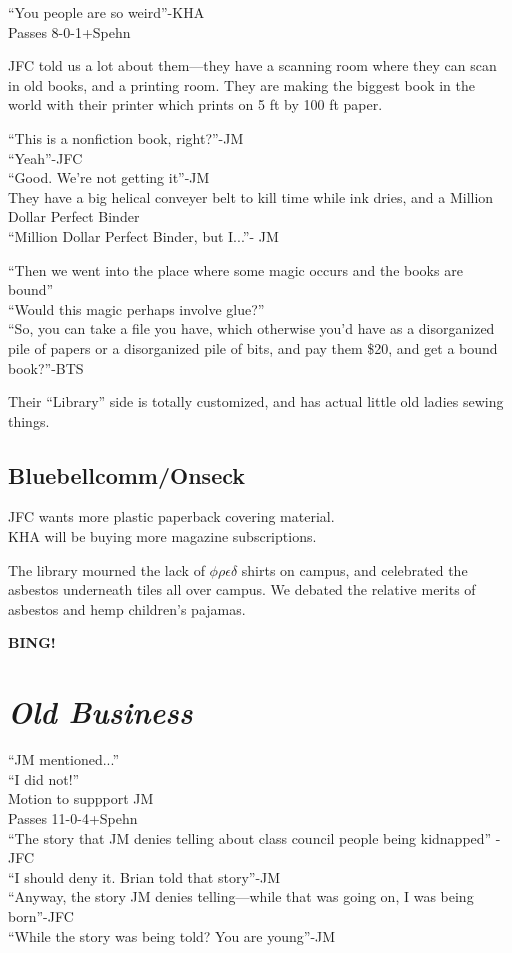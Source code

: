 \documentclass[10pt]{article}
\newcommand{\bing}{{\bf BING!} }
\newcommand{\goto}[1]{\bing \vskip 12pt \section*{{\em{#1}}}}
\begin{document}
``You people are so weird''-KHA\\
Passes 8-0-1+Spehn

JFC told us a lot about them---they have a scanning room where they
can scan in old books, and a printing room. They are making the
biggest book in the world with their printer which prints on 5 ft by
100 ft paper.

``This is a nonfiction book, right?''-JM\\
``Yeah''-JFC\\
``Good. We're not getting it''-JM\\

They have a big helical conveyer belt to kill time while ink dries,
and a Million Dollar Perfect Binder\\
``Million Dollar Perfect Binder, but I...''- JM

``Then we went into the place where some magic occurs and the books
are bound'' \\
``Would this magic perhaps involve glue?''\\

``So, you can take a file you have, which otherwise you'd have as a
disorganized pile of papers or a disorganized pile of bits, and pay
them \$20, and get a bound book?''-BTS

Their ``Library'' side is totally customized, and has actual little
old ladies sewing things.

\subsection*{Bluebellcomm/Onseck}
JFC wants more plastic paperback covering material.\\
KHA will be buying more magazine subscriptions.

The library mourned the lack of $\phi \rho \epsilon \delta$ shirts on
campus, and celebrated the asbestos underneath tiles all over campus.
We debated the relative merits of asbestos and hemp children's
pajamas.

\goto{Old Business}
``JM mentioned...''\\
``I did not!''\\
Motion to suppport JM\\
Passes 11-0-4+Spehn\\
``The story that JM denies telling about class council people being
kidnapped'' -JFC\\
 ``I should deny it. Brian told that story''-JM\\
``Anyway, the story JM denies telling---while that was going on, I was
being born''-JFC\\
``While the story was being told? You are young''-JM
\end{document}
